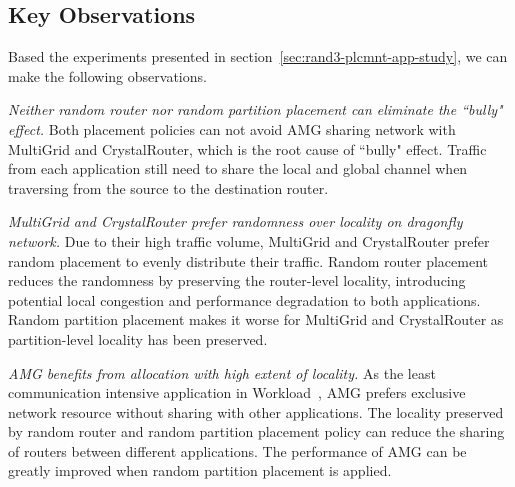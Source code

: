 \subsection{Key Observations}

Based the experiments presented in section~\ref{sec:rand3-plcmnt-app-study}, we can make the following observations.

\textit{Neither random router nor random partition placement can eliminate the ``bully" effect.}
Both placement policies can not avoid AMG sharing network with MultiGrid and CrystalRouter, which is the root cause of ``bully" effect. Traffic from each application still need to share the local and global channel when traversing from the source to the destination router. 

\textit{MultiGrid and CrystalRouter prefer randomness over locality on dragonfly network.}
Due to their high traffic volume, MultiGrid and CrystalRouter prefer random placement to evenly distribute their traffic. 
Random router placement reduces the randomness by preserving the router-level locality, introducing potential local congestion and performance degradation to both applications. 
Random partition placement makes it worse for MultiGrid and CrystalRouter as partition-level locality has been preserved. 


\textit{AMG benefits from allocation with high extent of locality.} As the least communication intensive application in Workload~, AMG prefers exclusive network resource without sharing with other applications. 
The locality preserved by random router and random partition placement policy can reduce the  sharing of routers between different applications. 
The performance of AMG can be greatly improved when random partition placement is applied.





















